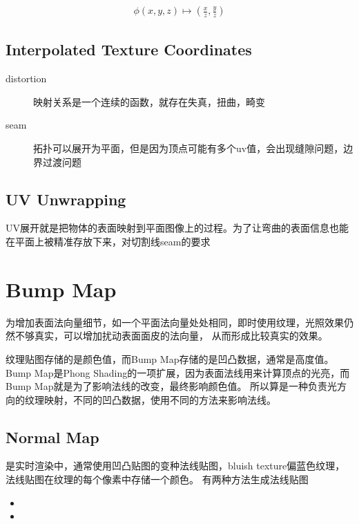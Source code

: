 \begin{align*}
    \phi(x,y,z) \mapsto (\frac{x}{z},\frac{y}{z})
\end{align*}

\subsection{Interpolated Texture Coordinates }

\begin{description}
    \item [distortion] \textsf{映射关系是一个连续的函数，就存在失真，扭曲，畸变}
    \item [seam] \textsf{拓扑可以展开为平面，但是因为顶点可能有多个uv值，会出现缝隙问题，边界过渡问题}
\end{description}

\subsection{UV Unwrapping}

UV展开就是把物体的表面映射到平面图像上的过程。为了让弯曲的表面信息也能在平面上被精准存放下来，对切割线seam的要求

\section{Bump Map}

为增加表面法向量细节，如一个平面法向量处处相同，即时使用纹理，光照效果仍然不够真实，可以增加扰动表面面皮的法向量，
从而形成比较真实的效果。

纹理贴图存储的是颜色值，而Bump Map存储的是凹凸数据，通常是高度值。
Bump Map是Phong Shading的一项扩展，因为表面法线用来计算顶点的光亮，而Bump Map就是为了影响法线的改变，最终影响颜色值。
所以算是一种负责光方向的纹理映射，不同的凹凸数据，使用不同的方法来影响法线。

\subsection{Normal Map}

是实时渲染中，通常使用凹凸贴图的变种法线贴图，bluish texture偏蓝色纹理，法线贴图在纹理的每个像素中存储一个颜色。
有两种方法生成法线贴图
\begin{itemize}
    \item {}
    \item {}
\end{itemize}

